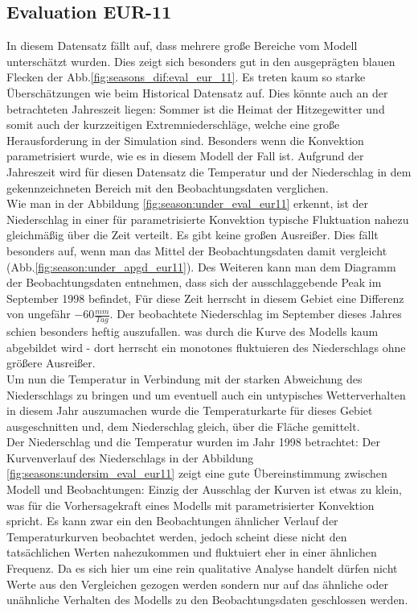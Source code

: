 \subsection{Evaluation EUR-11}\label{sec:eval_eur_11}
In diesem Datensatz fällt auf, dass mehrere große Bereiche vom Modell unterschätzt wurden. Dies zeigt sich besonders gut in den ausgeprägten blauen Flecken der Abb.\ref{fig:seasons_dif:eval_eur_11}. Es treten kaum so starke Überschätzungen wie beim Historical Datensatz auf. Dies könnte auch an der betrachteten Jahreszeit liegen: Sommer ist die Heimat der Hitzegewitter und somit auch der kurzzeitigen Extremniederschläge, welche eine große Herausforderung in der Simulation sind. Besonders wenn die Konvektion parametrisiert wurde, wie es in diesem Modell der Fall ist. Aufgrund der Jahreszeit wird für diesen Datensatz die Temperatur und der Niederschlag in dem gekennzeichneten Bereich mit den Beobachtungsdaten verglichen.\\
Wie man in der Abbildung \ref{fig:season:under_eval_eur11} erkennt, ist der Niederschlag in einer für parametrisierte Konvektion typische Fluktuation nahezu gleichmäßig über die Zeit verteilt. Es gibt keine großen Ausreißer. Dies fällt besonders auf, wenn man das Mittel der Beobachtungsdaten damit vergleicht (Abb.\ref{fig:season:under_apgd_eur11}). Des Weiteren kann man dem Diagramm der Beobachtungsdaten entnehmen, dass sich der ausschlaggebende Peak im September 1998 befindet, Für diese Zeit herrscht in diesem Gebiet eine Differenz von ungefähr $-60\frac{mm}{Tag}$. Der beobachtete Niederschlag im September dieses Jahres schien besonders heftig auszufallen. was durch die Kurve des Modells kaum abgebildet wird - dort herrscht ein monotones fluktuieren des Niederschlags ohne größere Ausreißer.\\
Um nun die Temperatur in Verbindung mit der starken Abweichung des Niederschlags zu bringen und um eventuell auch ein untypisches Wetterverhalten in diesem Jahr auszumachen wurde die Temperaturkarte für dieses Gebiet ausgeschnitten und, dem Niederschlag gleich, über die Fläche gemittelt.\\
Der Niederschlag und die Temperatur wurden im Jahr 1998 betrachtet: Der Kurvenverlauf des Niederschlags in der Abbildung \ref{fig:seasons:undersim_eval_eur11} zeigt eine gute Übereinstimmung zwischen Modell und Beobachtungen: Einzig der Ausschlag der Kurven ist etwas zu klein, was für die Vorhersagekraft eines Modells mit parametrisierter Konvektion spricht. Es kann zwar ein den Beobachtungen ähnlicher Verlauf der Temperaturkurven beobachtet werden, jedoch scheint diese nicht den tatsächlichen Werten nahezukommen und fluktuiert eher in einer ähnlichen Frequenz. Da es sich hier um eine rein qualitative Analyse handelt dürfen nicht Werte aus den Vergleichen gezogen werden sondern nur auf das ähnliche oder unähnliche Verhalten des Modells zu den Beobachtungsdaten geschlossen werden.

